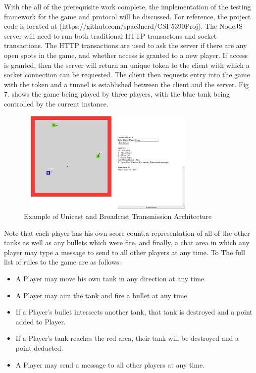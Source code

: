 \documentclass[conference]{IEEEtran}
\begin{document}
With the all of the prerequisite work complete, the implementation of the testing framework for the game and protocol will be discussed. For reference,
the project code is located at (https://github.com/spac3nerd/CSI-5390Proj). The NodeJS server 
will need to run both traditional HTTP transactons and socket transactions. The HTTP transactions are used to ask the server if 
there are any open spots in the game, and whether access is granted to a new player. If access is granted, then the server will return 
an unique token to the client with which a socket connection can be requested. The client then requests entry into the game 
with the token and a tunnel is established between the client and the server. Fig 7. shows the game being played by three players, with
the blue tank being controlled by the current instance.  


\begin{figure}[htbp]
\centerline{\includegraphics [width = 9cm, height = 5cm] {GameScreenshot.jpg}}
\caption{Example of Unicast and Broadcast Transmission Architecture}
\end{figure}

Note that each player has his own score count,a representation of all of the other tanks as well as any bullets which were fire, and finally, a chat area
in which any player may type a message to send to all other players at any time. To The full list of rules to the game are as follows:

\begin{itemize}
  \item A Player may move his own tank in any direction at any time.
  \item A Player may aim the tank and fire a bullet at any time.
  \item If a Player's bullet intersects another tank, that tank is destroyed and a point added to Player.
  \item If a Player's tank reaches the red area, their tank will be destroyed and a point deducted.
  \item A Player may send a message to all other players at any time.
\end{itemize}
\end{document}
